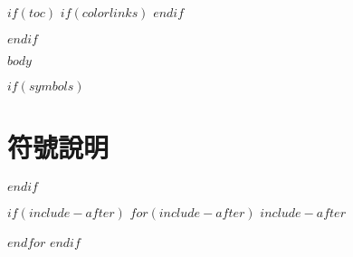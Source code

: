 \documentclass[$if(fontsize)$$fontsize$,$endif$$if(lang)$$babel-lang$,$endif$$if(papersize)$$papersize$paper,$endif$$for(classoption)$$classoption$$sep$,$endfor$]{$documentclass$}
\renewcommand{\thechapter}{第\zhnum{chapter}章}
\renewcommand{\thesection}{\arabic{chapter}.\arabic{section}}
\renewcommand{\thesubsection}{\thesection.\arabic{subsection}}
\begin{document}
$if(toc)$
\begingroup
    \renewcommand{\contentsname}{\center 目錄 \addcontentsline{toc}{chapter}{目錄}}
    \renewcommand{\numberline}[1]{~#1\hspace*{1em}}
    $if(colorlinks)$
    \hypersetup{linkcolor=$if(toccolor)$$toccolor$$else$black$endif$}
    $endif$
    \setcounter{tocdepth}{$toc-depth$}
    \tableofcontents
    \newcommand{\lotlabel}{表}
    \renewcommand{\listtablename}{\center 表目錄 \addcontentsline{toc}{chapter}{表目錄}}
    \renewcommand{\numberline}[1]{\lotlabel~#1\hspace*{1em}}
    \listoftables
    \newcommand{\loflabel}{圖}
    \renewcommand{\listfigurename}{\center 圖目錄 \addcontentsline{toc}{chapter}{圖目錄}}
    \renewcommand{\numberline}[1]{\loflabel~#1\hspace*{1em}}
    \listoffigures
\endgroup
$endif$

\mainmatter
$body$

$if(symbols)$
\chapter*{符號說明}
\fontsize{14}{21}\selectfont{$symbols$}
$endif$


$if(include-after)$
\setcounter{appendix_counter}{1}
\renewcommand{\thechapter}{附錄\zhnum{appendix_counter}}
\renewcommand{\thesection}{\arabic{section}.}
\renewcommand{\thesubsection}{\arabic{section}-\arabic{subsection}}
$for(include-after)$
\newpage
$include-after$
\addtocounter{appendix_counter}{1}
$endfor$
$endif$

\end{document}
